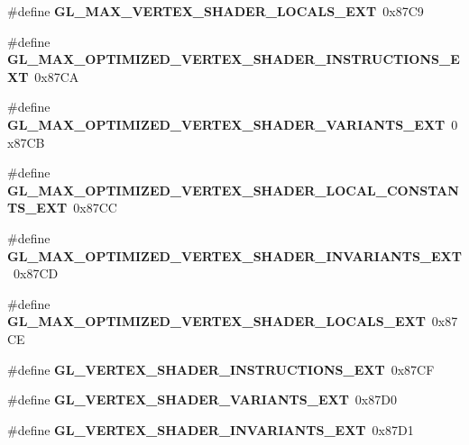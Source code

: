 \begin{DoxyCompactItemize}
\item 
\#define {\bfseries G\+L\+\_\+\+M\+A\+X\+\_\+\+V\+E\+R\+T\+E\+X\+\_\+\+S\+H\+A\+D\+E\+R\+\_\+\+L\+O\+C\+A\+L\+S\+\_\+\+E\+X\+T}~0x87\+C9\label{_s_d_l__opengl_8h_a65ee2f939bf5d47edc55c7da35dbf167}

\item 
\#define {\bfseries G\+L\+\_\+\+M\+A\+X\+\_\+\+O\+P\+T\+I\+M\+I\+Z\+E\+D\+\_\+\+V\+E\+R\+T\+E\+X\+\_\+\+S\+H\+A\+D\+E\+R\+\_\+\+I\+N\+S\+T\+R\+U\+C\+T\+I\+O\+N\+S\+\_\+\+E\+X\+T}~0x87\+C\+A\label{_s_d_l__opengl_8h_a8c2f729f1c891b520b9240d360a9cc35}

\item 
\#define {\bfseries G\+L\+\_\+\+M\+A\+X\+\_\+\+O\+P\+T\+I\+M\+I\+Z\+E\+D\+\_\+\+V\+E\+R\+T\+E\+X\+\_\+\+S\+H\+A\+D\+E\+R\+\_\+\+V\+A\+R\+I\+A\+N\+T\+S\+\_\+\+E\+X\+T}~0x87\+C\+B\label{_s_d_l__opengl_8h_a89298280d2f8d7f537f573c27ef3dce8}

\item 
\#define {\bfseries G\+L\+\_\+\+M\+A\+X\+\_\+\+O\+P\+T\+I\+M\+I\+Z\+E\+D\+\_\+\+V\+E\+R\+T\+E\+X\+\_\+\+S\+H\+A\+D\+E\+R\+\_\+\+L\+O\+C\+A\+L\+\_\+\+C\+O\+N\+S\+T\+A\+N\+T\+S\+\_\+\+E\+X\+T}~0x87\+C\+C\label{_s_d_l__opengl_8h_ac89ce8c69a96bf2695806fa0e4fc7d2c}

\item 
\#define {\bfseries G\+L\+\_\+\+M\+A\+X\+\_\+\+O\+P\+T\+I\+M\+I\+Z\+E\+D\+\_\+\+V\+E\+R\+T\+E\+X\+\_\+\+S\+H\+A\+D\+E\+R\+\_\+\+I\+N\+V\+A\+R\+I\+A\+N\+T\+S\+\_\+\+E\+X\+T}~0x87\+C\+D\label{_s_d_l__opengl_8h_a4009460449fb2df6b87e02795e804e23}

\item 
\#define {\bfseries G\+L\+\_\+\+M\+A\+X\+\_\+\+O\+P\+T\+I\+M\+I\+Z\+E\+D\+\_\+\+V\+E\+R\+T\+E\+X\+\_\+\+S\+H\+A\+D\+E\+R\+\_\+\+L\+O\+C\+A\+L\+S\+\_\+\+E\+X\+T}~0x87\+C\+E\label{_s_d_l__opengl_8h_a892527003835bfba147a2753a1418e1c}

\item 
\#define {\bfseries G\+L\+\_\+\+V\+E\+R\+T\+E\+X\+\_\+\+S\+H\+A\+D\+E\+R\+\_\+\+I\+N\+S\+T\+R\+U\+C\+T\+I\+O\+N\+S\+\_\+\+E\+X\+T}~0x87\+C\+F\label{_s_d_l__opengl_8h_a0ea64049abd884e9cebaaa8b95e1041d}

\item 
\#define {\bfseries G\+L\+\_\+\+V\+E\+R\+T\+E\+X\+\_\+\+S\+H\+A\+D\+E\+R\+\_\+\+V\+A\+R\+I\+A\+N\+T\+S\+\_\+\+E\+X\+T}~0x87\+D0\label{_s_d_l__opengl_8h_ad6eb89b849a8e30bed30c3da862fcea9}

\item 
\#define {\bfseries G\+L\+\_\+\+V\+E\+R\+T\+E\+X\+\_\+\+S\+H\+A\+D\+E\+R\+\_\+\+I\+N\+V\+A\+R\+I\+A\+N\+T\+S\+\_\+\+E\+X\+T}~0x87\+D1\label{_s_d_l__opengl_8h_a04d8ac005fc6e8c6bfbf4e95689ebbd5}


\end{DoxyCompactItemize}
